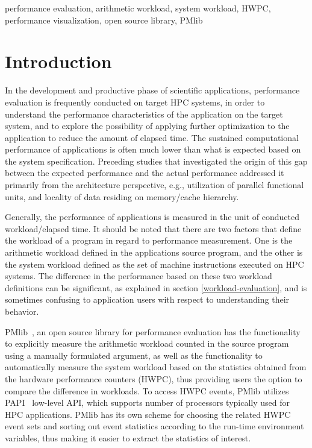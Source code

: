 \documentclass[conference]{IEEEtran}
\begin{document}
\begin{IEEEkeywords}
performance evaluation,
arithmetic workload,
system workload,
HWPC,
performance visualization,
open source library,
PMlib
\end{IEEEkeywords}

\section{Introduction}
In the development and productive phase of scientific applications,
performance evaluation is frequently conducted on target HPC systems,
in order to understand the performance characteristics
of the application on the target system, and to explore the possibility of
applying further optimization to the application to reduce the amount of
elapsed time.
The sustained computational performance of applications is often much
lower than what is expected based on the system specification.
Preceding studies that investigated the origin of this gap between
the expected performance and the actual performance addressed it
primarily from the architecture perspective, e.g., 
utilization of parallel functional units,
and locality of data residing on memory/cache hierarchy.

Generally, the performance of applications is measured in the unit of
conducted workload/elapsed time.
It should be noted that there are two factors that define the workload
of a program in regard to performance measurement. 
One is the arithmetic workload defined in the applications source program,
and the other is the system workload defined as the set of
machine instructions executed on HPC systems.
The difference in the performance based on these two workload definitions
can be significant, as explained in section \ref{workload-evaluation},
and is sometimes confusing to application users with respect to
understanding their behavior.

PMlib~\cite{PMlib:webpage-public}, an open source library for performance
evaluation has the functionality
to explicitly measure the arithmetic workload counted in the source program
using a manually formulated argument, as well as the functionality
to automatically measure the system workload based on the statistics
obtained from the hardware performance counters (HWPC),
thus providing users the option to compare the difference in workloads.
To access HWPC events, PMlib utilizes PAPI~\cite{PAPI:5.6} low-level API,
which supports number of processors typically used for HPC applications.
PMlib has its own scheme for choosing the related HWPC event sets and sorting
out event statistics according to the run-time environment variables,
thus making it easier to extract the statistics of interest.
\end{document}
